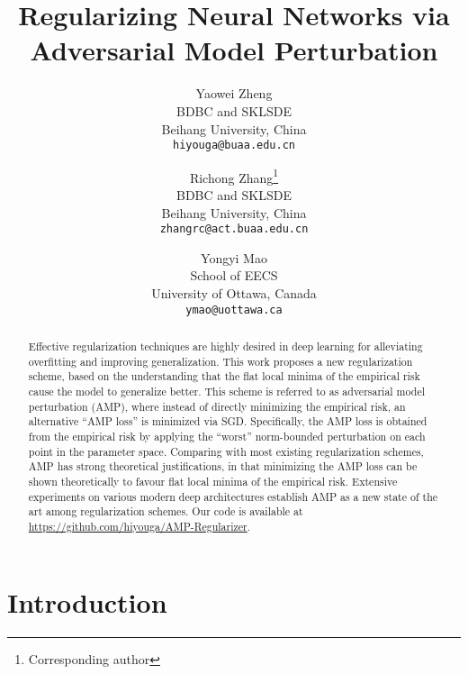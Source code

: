 \documentclass[final]{cvpr}
\begin{document}
\title{Regularizing Neural Networks via Adversarial Model Perturbation}

\author{Yaowei Zheng\\
BDBC and SKLSDE\\
Beihang University, China\\
{\tt\small hiyouga@buaa.edu.cn}
\and
Richong Zhang\thanks{Corresponding author}\\
BDBC and SKLSDE\\
Beihang University, China\\
{\tt\small zhangrc@act.buaa.edu.cn}
\and
Yongyi Mao\\
School of EECS\\
University of Ottawa, Canada\\
{\tt\small ymao@uottawa.ca}
}

\maketitle

\begin{abstract}

Effective regularization techniques are highly desired in deep learning for alleviating overfitting and improving generalization. This work proposes a new regularization scheme, based on the understanding that the flat local minima of the empirical risk cause the model to generalize better. This scheme is referred to as adversarial model perturbation (AMP), where instead of directly minimizing the empirical risk, an alternative ``AMP loss'' is minimized via SGD. Specifically, the AMP loss is obtained from the empirical risk by applying the ``worst'' norm-bounded perturbation on each point in the parameter space. Comparing with most existing regularization schemes, AMP has strong theoretical justifications, in that minimizing the AMP loss can be shown theoretically to favour flat local minima of the empirical risk. Extensive experiments on various modern deep architectures establish AMP as a new state of the art among regularization schemes. Our code is available at \url{https://github.com/hiyouga/AMP-Regularizer}.

\end{abstract}

\let\thefootnote\relax{}

\section{Introduction}
\end{document}
